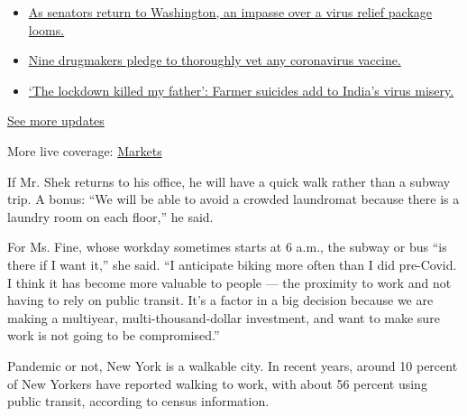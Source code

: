 \begin{itemize}
\tightlist
\item
  \href{https://www.nytimes3xbfgragh.onion/2020/09/08/world/covid-19-coronavirus.html?action=click\&pgtype=Article\&state=default\&region=MAIN_CONTENT_1\&context=storylines_live_updates\#link-4a77847f}{As
  senators return to Washington, an impasse over a virus relief package
  looms.}
\item
  \href{https://www.nytimes3xbfgragh.onion/2020/09/08/world/covid-19-coronavirus.html?action=click\&pgtype=Article\&state=default\&region=MAIN_CONTENT_1\&context=storylines_live_updates\#link-679303d7}{Nine
  drugmakers pledge to thoroughly vet any coronavirus vaccine.}
\item
  \href{https://www.nytimes3xbfgragh.onion/2020/09/08/world/covid-19-coronavirus.html?action=click\&pgtype=Article\&state=default\&region=MAIN_CONTENT_1\&context=storylines_live_updates\#link-1c973131}{`The
  lockdown killed my father': Farmer suicides add to India's virus
  misery.}
\end{itemize}

\href{https://www.nytimes3xbfgragh.onion/2020/09/08/world/covid-19-coronavirus.html?action=click\&pgtype=Article\&state=default\&region=MAIN_CONTENT_1\&context=storylines_live_updates}{See
more updates}

More live coverage:
\href{https://www.nytimes3xbfgragh.onion/live/2020/09/08/business/stock-market-today-coronavirus?action=click\&pgtype=Article\&state=default\&region=MAIN_CONTENT_1\&context=storylines_live_updates}{Markets}

If Mr. Shek returns to his office, he will have a quick walk rather than
a subway trip. A bonus: ``We will be able to avoid a crowded laundromat
because there is a laundry room on each floor,'' he said.

For Ms. Fine, whose workday sometimes starts at 6 a.m., the subway or
bus ``is there if I want it,'' she said. ``I anticipate biking more
often than I did pre-Covid. I think it has become more valuable to
people --- the proximity to work and not having to rely on public
transit. It's a factor in a big decision because we are making a
multiyear, multi-thousand-dollar investment, and want to make sure work
is not going to be compromised.''

Pandemic or not, New York is a walkable city. In recent years, around 10
percent of New Yorkers have reported walking to work, with about 56
percent using public transit, according to census information.

